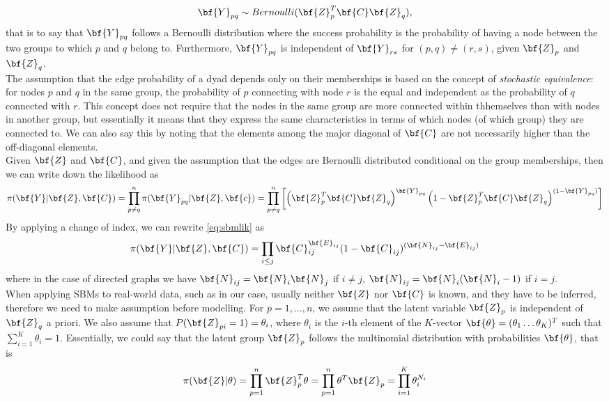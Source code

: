 \[
    \bf{Y}_{pq} \sim Bernoulli(\bf{Z}^T_p \bf{C} \bf{Z}_q),
\]
that is to say that $\bf{Y}_{pq}$ follows a Bernoulli distribution where the success probability is the probability of having a node between the two groups to which $p$ and $q$ belong to. Furthermore, $\bf{Y}_{pq}$ is independent of $\bf{Y}_{rs}$ for $(p,q) \neq (r,s)$, given $\bf{Z}_p$ and $\bf{Z}_q$.\\
The assumption that the edge probability of a dyad depends only on their memberships is based on the concept of \textit{stochastic equivalence}: for nodes $p$ and $q$ in the same group, the probability of $p$ connecting with node $r$ is the equal and independent as the probability of $q$ connected with $r$. This concept does not require that the nodes in the same group are more connected within thhemselves than with nodes in another group, but essentially it means that they express the same characteristics in terms of which nodes (of which group) they are connected to. We can also say this by noting that the elements among the major diagonal of $\bf{C}$ are not necessarily higher than the off-diagonal elements.\\
Given $\bf{Z}$ and $\bf{C}$, and given the assumption that the edges are Bernoulli distributed conditional on the group memberships, then we can write down the likelihood as 
\begin{equation}\label{eq:sbmlik}
    \pi (\bf{Y}|\bf{Z},\bf{C}) = \prod_{p\neq q}^n \pi(\bf{Y}_{pq}|\bf{Z},\bf{c}) 
    = \prod_{p\neq q}^n \left[ \left( \bf{Z}^T_p \bf{C} \bf{Z}_q \right)^{\bf{Y}_{pq}} \left( 1 - \bf{Z}^T_p \bf{C} \bf{Z}_q \right)^{(1-\bf{Y}_{pq})} \right]
\end{equation}
By applying a change of index, we can rewrite \ref{eq:sbmlik} as
\begin{equation}
    \pi (\bf{Y}|\bf{Z},\bf{C}) = \prod_{i \leq j} \bf{C}^{\bf{E}_{ij}}_{ij} (1 - \bf{C}_{ij})^{(\bf{N}_{ij} - \bf{E}_{ij})}
\end{equation}
where in the case of directed graphs we have $\bf{N}_{ij} = \bf{N}_i\bf{N}_j$ if $i \neq j$, $\bf{N}_{ij} = \bf{N}_i(\bf{N}_i-1)$ if $i=j$.\\
When applying SBMs to real-world data, such as in our case, usually neither $\bf{Z}$ nor $\bf{C}$ is known, and they have to be inferred, therefore we need to make assumption before modelling. For $p = 1,...,n$, we assume that the latent variable $\bf{Z}_p$ is independent of $\bf{Z}_q$ a priori. We also assume that $P(\bf{Z}_{pi}=1) = \theta_i$, where $\theta_i$ is the $i$-th element of the $K$-vector $\bf{\theta} = (\theta_1 \dots \theta_K)^T$ such that $\sum_{i=1}^K \theta_i = 1$. Essentially, we could say that the latent group $\bf{Z}_p$ follows the multinomial distribution with probabilities $\bf{\theta}$, that is
\begin{equation}
    \pi(\bf{Z}|\theta) = \prod_{p=1}^n \bf{Z}_p^T \theta = \prod_{p=1}^n \theta^T \bf{Z}_p = \prod_{i=1}^K \theta^{N_i}_i
\end{equation}
